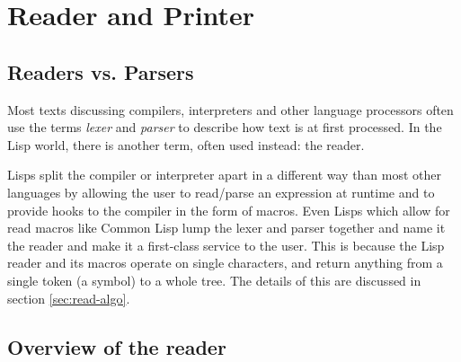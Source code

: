 \documentclass[a4paper,10pt,twoside]{report}
\newcommand{\el}{Emacs Lisp}
\newcommand{\cl}{Common Lisp}
\begin{document}


\chapter{Reader and Printer}
\label{sec:reader-printer}

\section{Readers vs. Parsers}
\label{subsec:readers-vs-parsers}

Most texts discussing compilers, interpreters and other language processors
often use the terms \emph{lexer} and \emph{parser} to describe how text is at
first processed.  In the Lisp world, there is another term, often used instead:
the reader.

Lisps split the compiler or interpreter apart in a different way than most other
languages by allowing the user to read/parse an expression at runtime and to
provide hooks to the compiler in the form of macros.  Even Lisps which allow for
read macros like \cl{} lump the lexer and parser together and name it the reader
and make it a first-class service to the user.  This is because the Lisp reader
and its macros operate on single characters, and return anything from a single
token (a symbol) to a whole tree.  The details of this are discussed in section
\ref{sec:read-algo}.

\section{Overview of the reader}
\label{subsec:reader}
\end{document}

